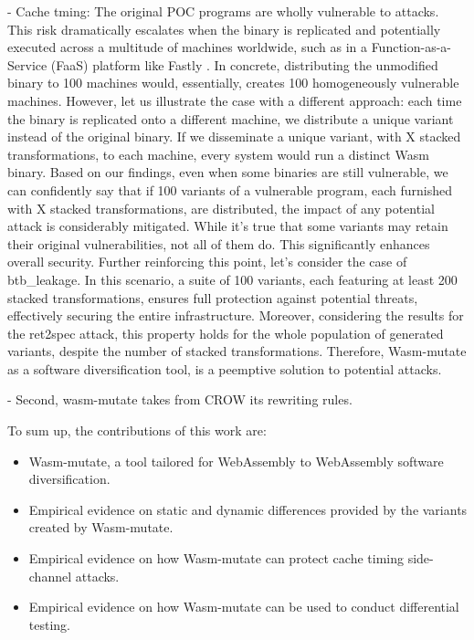 \documentclass[sigplan,screen]{acmart}
\newcommand{\tool}{Wasm-mutate\xspace}
\newcommand{\wasm}{Wasm\xspace}
\begin{document}
- Cache tming: \cite{Genkin2018DrivebyKC}
The original POC programs are wholly vulnerable to attacks. 
This risk dramatically escalates when the binary is replicated and potentially executed across a multitude of machines worldwide, such as in a Function-as-a-Service (FaaS) platform like Fastly \cite{MEWE}.
In concrete, distributing the unmodified binary to 100 machines would, essentially, creates 100 homogeneously vulnerable machines.
However, let us illustrate the case with a different approach: each time the binary is replicated onto a different machine, we distribute a unique variant instead of the original binary. 
If we disseminate a unique variant, with X stacked transformations, to each machine, every system would run a distinct \wasm binary. 
Based on our findings, even when some binaries are still vulnerable, we can confidently say that if 100 variants of a vulnerable program, each furnished with X stacked transformations, are distributed, the impact of any potential attack is considerably mitigated.
While it's true that some variants may retain their original vulnerabilities, not all of them do. 
This significantly enhances overall security. 
Further reinforcing this point, let's consider the case of btb\_leakage. 
In this scenario, a suite of 100 variants, each featuring at least 200 stacked transformations, ensures full protection against potential threats, effectively securing the entire infrastructure.
Moreover, considering the results for the ret2spec attack, this property holds for the whole population of generated variants, despite the number of stacked transformations.
Therefore, \tool as a software diversification tool, is a peemptive solution to potential attacks.


- Second, wasm-mutate takes from CROW its rewriting rules.

To sum up, the contributions of this work are:

\begin{itemize}
    \item \tool, a tool tailored for WebAssembly to WebAssembly software diversification.
    \item Empirical evidence on static and dynamic differences provided by the variants created by \tool.
    \item Empirical evidence on how \tool can protect cache timing side-channel attacks.
    \item Empirical evidence on how \tool can be used to conduct differential testing.
    
\end{itemize}
\end{document}
